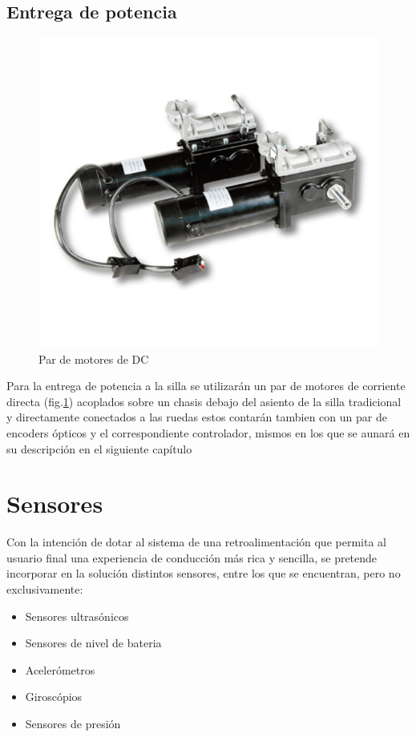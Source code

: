 \subsection{Entrega de potencia}

\begin{figure}[th]
    \centering
    \includegraphics[width=.5\textwidth]{Figures/motor.png}
    \decoRule
    \caption{Par de motores de DC}
    \label{fig:motor}
\end{figure}

Para la entrega de potencia a la silla se utilizar\'an un par de motores de
corriente directa (fig.\ref{fig:motor}) acoplados sobre un chasis debajo del asiento de la silla
tradicional y directamente conectados a las ruedas estos contar\'an tambien con
un par de encoders \'opticos y el correspondiente controlador, mismos en los que
se aunar\'a en su descripci\'on en el siguiente cap\'itulo

\section{Sensores}

Con la intenci\'on de dotar al sistema de una retroalimentaci\'on que permita al
usuario final una experiencia de conducci\'on m\'as rica y sencilla, se pretende
incorporar en la soluci\'on distintos sensores, entre los que se encuentran,
pero no exclusivamente:
\begin{itemize}
    \item Sensores ultras\'onicos
    \item Sensores de nivel de bateria
    \item Aceler\'ometros
    \item Girosc\'opios
    \item Sensores de presi\'on
\end{itemize}
